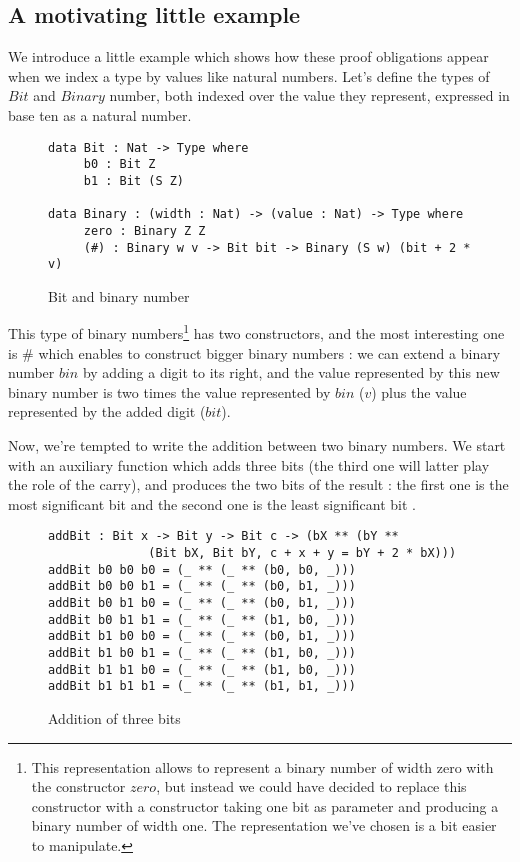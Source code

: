 \subsection{A motivating little example}
We introduce a little example which shows how these proof obligations appear when we index a type by values like natural numbers.
Let's define the types of $Bit$ and $Binary$ number, both indexed over the value they represent, expressed in base ten as a natural number.
\begin{figure}[H]
\figrule
\begin{center}
\begin{lstlisting}
data Bit : Nat -> Type where
     b0 : Bit Z
     b1 : Bit (S Z)
     
data Binary : (width : Nat) -> (value : Nat) -> Type where
     zero : Binary Z Z
     (#) : Binary w v -> Bit bit -> Binary (S w) (bit + 2 * v)
\end{lstlisting}
\end{center}
\caption{Bit and binary number}
\figrule
\end{figure}

This type of binary numbers\footnote{This representation allows to represent a binary number of width zero with the constructor $zero$, but instead we could have decided to replace this constructor with a constructor taking one bit as parameter and producing a binary number of width one. The representation we've chosen is a bit easier to manipulate.}  has two constructors, and the most interesting one is $\#$ which enables to construct bigger binary numbers : we can extend a binary number $bin$ by adding a digit to its right, and the value represented by this new binary number is two times the value represented by $bin$ ($v$) plus the value represented by the added digit ($bit$).

Now, we're tempted to write the addition between two binary numbers.
We start with an auxiliary function which adds three bits (the third one will latter play the role of the carry), and produces the two bits of the result : the first one is the most significant bit and the second one is the least significant bit .

\begin{figure}[H]
\figrule
\begin{center}
\begin{lstlisting}
addBit : Bit x -> Bit y -> Bit c -> (bX ** (bY ** 
              (Bit bX, Bit bY, c + x + y = bY + 2 * bX)))
addBit b0 b0 b0 = (_ ** (_ ** (b0, b0, _)))
addBit b0 b0 b1 = (_ ** (_ ** (b0, b1, _)))
addBit b0 b1 b0 = (_ ** (_ ** (b0, b1, _)))
addBit b0 b1 b1 = (_ ** (_ ** (b1, b0, _)))
addBit b1 b0 b0 = (_ ** (_ ** (b0, b1, _)))
addBit b1 b0 b1 = (_ ** (_ ** (b1, b0, _)))
addBit b1 b1 b0 = (_ ** (_ ** (b1, b0, _)))
addBit b1 b1 b1 = (_ ** (_ ** (b1, b1, _)))
\end{lstlisting}
\end{center}
\caption{Addition of three bits}
\figrule
\end{figure}

